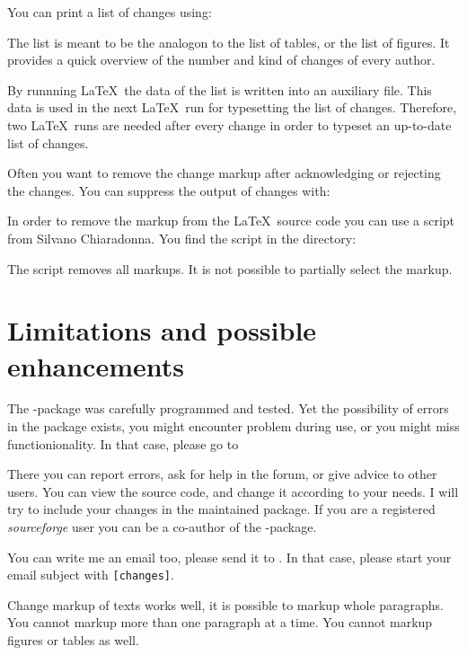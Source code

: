 
You can print a list of changes using:


The list is meant to be the analogon to the list of tables, or the list of figures.
It provides a quick overview of the number and kind of changes of every author.

By runnning \LaTeX\ the data of the list is written into an auxiliary file.
This data is used in the next \LaTeX\ run for typesetting the list of changes.
Therefore, two \LaTeX\ runs are needed after every change in order to typeset an up-to-date list of changes.



Often you want to remove the change markup after acknowledging or rejecting the changes.
You can suppress the output of changes with:



In order to remove the markup from the \LaTeX\ source code  you can use a script from Silvano Chiaradonna.
You find the script in the directory:



The script removes all markups.
It is not possible to partially select the markup.

\section{Limitations and possible enhancements}
\label{sec:limitations}

The -package was carefully programmed and tested.
Yet the possibility of errors in the package exists, you might encounter problem during use, or you might miss functionionality.
In that case, please go to



There you can report errors, ask for help in the forum, or give advice to other users.
You can view the source code, and change it according to your needs.
I will try to include your changes in the maintained package.
If you are a registered \emph{sourceforge} user you can be a co-author of the -package.

You can write me an email too, please send it to .
In that case, please start your email subject with \texttt{[changes]}.

Change markup of texts works well, it is possible to markup whole paragraphs.
You cannot markup more than one paragraph at a time.
You cannot markup figures or tables as well.


